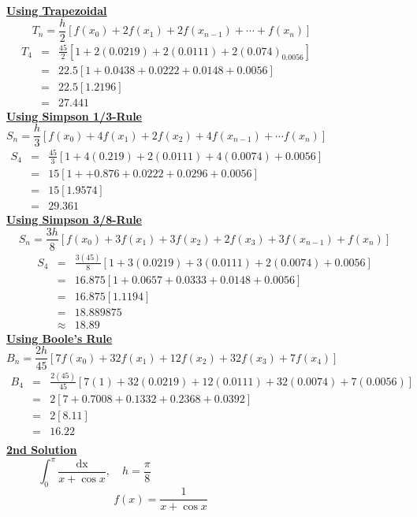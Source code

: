 \documentclass[12pt]{report}
\newcommand{\ubt}[1]{\textbf{\underline{#1}}}
\newcommand{\spn}[1]{\\[#1cm]}
\newcommand{\NI}{\noindent}
\begin{document}
	\ubt{Using Trapezoidal}
	\begin{equation*}
		T_n = \frac{h}{2}\left[f(x_0) + 2f(x_1) + 2f(x_{n-1}) + \cdots + f(x_n)\right]\qquad\qquad\qquad
	\end{equation*}
	\begin{eqnarray*}
		T_4 &=& \frac{45}{2}\left[1 + 2(0.0219) + 2(0.0111) + 2(0.074) _ 0.0056\right]\qquad\qquad\qquad\quad\spn{0.5}
		&=& 22.5\left[1 + 0.0438 + 0.0222 + 0.0148 + 0.0056\right]\spn{0.5}
		&=&22.5[1.2196]\spn{0.5}
		&=&27.441
	\end{eqnarray*}
	\ubt{Using Simpson 1/3-Rule}
	\begin{equation*}
		S_n = \frac{h}{3}\left[f(x_0) + 4f(x_1) + 2f(x_2) + 4f(x_{n-1}) + \cdots f(x_n)\right]\qquad\qquad\qquad\qquad\qquad
	\end{equation*}
	\begin{eqnarray*}
		S_4 &=& \frac{45}{3}\left[1 + 4(0.219) + 2(0.0111) + 4(0.0074) + 0.0056\right]\qquad\qquad\qquad\quad\spn{0.5}
		&=& 15\left[1 + + 0.876 + 0.0222 + 0.0296 + 0.0056\right]\spn{0.5}
		&=&15[1.9574]\spn{0.5}
		&=&29.361
	\end{eqnarray*}
	\newpage
	\NI\ubt{Using Simpson 3/8-Rule}
	$$
		S_n = \frac{3h}{8}\left[f(x_0) + 3f(x_1) + 3f(x_2)+ 2f(x_3) + 3f(x_{n-1})  + f(x_n)\right]
	$$
	\begin{eqnarray*}
		S_4 &=&\frac{3(45)}{8}\left[1 + 3(0.0219) + 3(0.0111) + 2(0.0074) + 0.0056\right]\spn{0.5}
		&=&16.875[1 + 0.0657 + 0.0333 + 0.0148 + 0.0056]\spn{0.5}
		&=&16.875[1.1194]\spn{0.1}
		&=& 18.889875\spn{0.1}
		&\approx& 18.89
	\end{eqnarray*}
	\NI\ubt{Using Boole's Rule}
	$$
		B_n = \frac{2h}{45}\left[7f(x_0) + 32f(x_1) + 12f(x_2)+ 32f(x_3) + 7f(x_4)\right]\qquad\qquad\qquad\qquad\qquad
	$$
	\begin{eqnarray*}
		B_4 &=&\frac{2(45)}{45}\left[7(1) + 32(0.0219) + 12(0.0111) + 32(0.0074) + 7(0.0056)\right]\spn{0.5}
		&=&2[7 + 0.7008 + 0.1332 + 0.2368 + 0.0392]\spn{0.5}
		&=& 2[8.11]\spn{0.1}
		&=& 16.22\spn{0.1}
	\end{eqnarray*}
	\ubt{2nd Solution}\\
	$$
		\int_{0}^{\pi} \frac{\text{dx}}{x + \cos x}, \quad h=\frac{\pi}{8}\qquad\qquad\qquad\qquad\qquad\qquad\qquad\qquad\qquad\qquad
	$$
	$$
		f(x) = \frac{1}{x + \cos x}\qquad\qquad\qquad\qquad
	$$\\
	
	\begin{center}
	\end{center}
	
\end{document}

